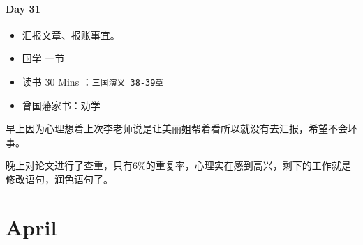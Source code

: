 \documentclass[UTF8,a4paper,8pt]{ctexart}
\begin{document}
 	 \paragraph{Day 31      \quad     }
	 	 \begin{itemize}[itemindent = 1em]
	 	 	\renewcommand\labelitemi{\makebox[0pt][l]{$\square$}\raisebox{.15ex}{\hspace{0.1em}$\checkmark$}}		
	 	 	
	 	 	\item    汇报文章、报账事宜。
	 	 	
	 	 	
	 	 	\renewcommand\labelitemi{\makebox[0pt][l]{$\square$}\hspace{1em}}
	 	 	\item   国学  一节
	 	 	\item   读书  30 Mins	：\verb|三国演义 38-39章|
	 	 	\item   曾国藩家书：劝学
	 	 \end{itemize}

		早上因为心理想着上次李老师说是让美丽姐帮着看所以就没有去汇报，希望不会坏事。
		
		晚上对论文进行了查重，只有6\%的重复率，心理实在感到高兴，剩下的工作就是修改语句，润色语句了。
		
\section{April}
\end{document}
